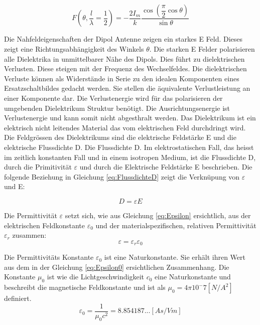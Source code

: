 \begin{equation}\label{eq:FDipolTheat}
F(\theta,\frac{l}{\lambda}=\dfrac{1}{2})=-\dfrac{2I_{m}}{k}\dfrac{\cos\left(\dfrac{\pi}{2}\cos\theta\right)}{\sin\theta}
\end{equation}


Die Nahfeldeigenschaften der Dipol Antenne zeigen ein starkes E Feld. Dieses zeigt eine Richtungsabhängigkeit  des Winkels $\theta$. Die starken E Felder polarisieren alle Dielektrika in unmittelbarer Nähe des Dipols. Dies führt zu dielektrischen Verlusten. Diese steigen mit der Frequenz des Wechselfeldes. Die dielektrischen Verluste können als Widerstände in Serie zu den idealen Komponenten eines Ersatzschaltbildes gedacht werden. Sie stellen die äquivalente Verlustleistung an einer Komponente dar. Die Verlustenergie wird für das polarisieren der umgebenden Dielektrikum Struktur benötigt. Die Ausrichtungsenergie ist Verlustenergie und kann somit nicht abgesthralt werden.
Das Dielektrikum ist ein elektrisch nicht leitendes Material das vom elektrischen Feld durchdringt wird. Die Feldgrössen des Dielektrikums sind die elektrische Feldstärke E und die elektrische Flussdichte D. Die Flussdichte D. Im elektrostatischen Fall, das heisst im zeitlich konstanten Fall und in einem isotropen Medium, ist die Flussdichte D, durch die Primitivität $\varepsilon $ und durch die Elektrische Feldstärke E beschrieben. Die folgende Beziehung in Gleichung \ref{eq:FlussdichteD} zeigt die Verknüpung von $\varepsilon $  und E:

\begin{equation}\label{eq:FlussdichteD}
D=\varepsilon E
\end{equation}

Die Permittivität $\varepsilon$ setzt sich, wie aus Gleichung \ref{eq:Epsilon} ersichtlich, aus der elektrischen Feldkonstante $\varepsilon_0$ und der materialspezifischen, relativen Permittivität $\varepsilon_r$ zusammen:
\begin{equation}\label{eq:Epsilon}
\varepsilon = \varepsilon_r \varepsilon_0
\end{equation}

Die Permittivitäts Konstante $\varepsilon_{0}$ ist eine Naturkonstante. Sie erhält ihren Wert aus dem in der Gleichung \ref{eq:Epsilon0} ersichtlichen Zusammenhang. Die Konstante $\mu_{0}  $ ist wie die Lichtgeschwindigkeit $c_0$ eine Naturkonstante und beschreibt die magnetische Feldkonstante und ist als  $\mu_{0}=4\pi10^-7 [N/A^{2}]$ definiert\cite{WikiPermitt}.
\begin{equation}\label{eq:Epsilon0}
\varepsilon_{0} = \dfrac{1}{\mu_{0}c^{2}}=8.854187...[As/Vm]
\end{equation}


